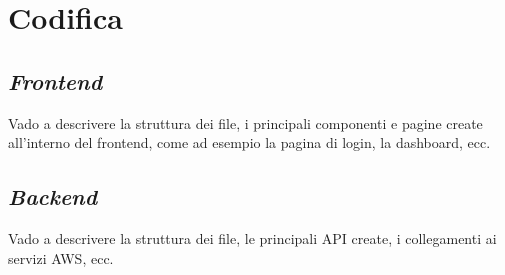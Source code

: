 \pagebreak
\section{Codifica}
\label{sez:codifica}


\subsection{\textit{Frontend}}
\label{sez:frontend}
Vado a descrivere la struttura dei file, i principali componenti e pagine create all'interno del frontend, come ad esempio la pagina di login, la dashboard, ecc.\\

\subsection{\textit{Backend}}
\label{sez:backend}

Vado a descrivere la struttura dei file, le principali API create, i collegamenti ai servizi AWS, ecc.\\